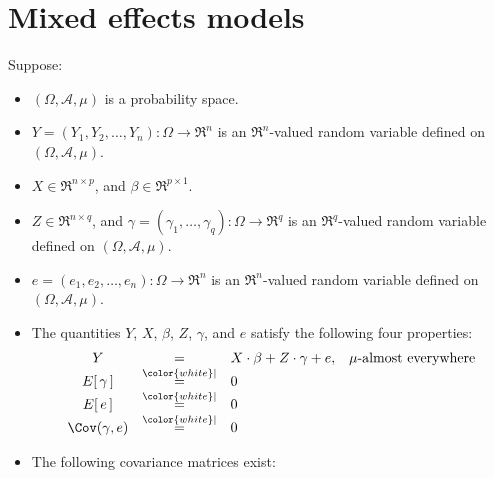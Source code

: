 

\section{Mixed effects models}
\setcounter{theorem}{0}
\setcounter{equation}{0}

\renewcommand{\theenumi}{\roman{enumi}}
\renewcommand{\labelenumi}{\textnormal{(\theenumi)}$\;\;$}


\begin{theorem}
\label{AMixedModelEquivalentFixedModel}
\mbox{}
\vskip 0.2cm
\noindent
Suppose:
\begin{itemize}
\item
	$(\Omega,\mathcal{A},\mu)$ is a probability space.
\item
	$Y = (Y_{1}, Y_{2}, \ldots, Y_{n}) : \Omega \longrightarrow \Re^{n}$ is an $\Re^{n}$-valued random variable
	defined on $(\Omega,\mathcal{A},\mu)$.
\item
	$X \in \Re^{n \times p}$, and $\beta \in \Re^{p \times 1}$.
\item
	$Z \in \Re^{n \times q}$, and
	$\gamma = (\gamma_{1},\ldots,\gamma_{q}) : \Omega \longrightarrow \Re^{q}$
	is an $\Re^{q}$-valued random variable defined on $(\Omega,\mathcal{A},\mu)$.
\item
	$e = (e_{1}, e_{2}, \ldots, e_{n}) : \Omega \longrightarrow \Re^{n}$ is an $\Re^{n}$-valued random variable
	defined on $(\Omega,\mathcal{A},\mu)$.
\item
	The quantities $Y$, $X$, $\beta$, $Z$, $\gamma$, and $e$ satisfy the following four properties:
	\begin{equation*}
	\begin{array}{ccll}
	Y & = & X \cdot \beta + Z \cdot \gamma + e, & \textnormal{$\mu$-almost everywhere}
	\\
	E\!\left[\,\gamma\,\right] &\overset{{\color{white}\vert}}{=}& 0
	\\
	E\!\left[\,e\,\right] &\overset{{\color{white}\vert}}{=}& 0
	\\
	\Cov\!\left(\gamma,e\right) &\overset{{\color{white}\vert}}{=}& 0	
	\end{array}
	\end{equation*}
\item
	The following covariance matrices exist:

\end{itemize}
\end{theorem}
